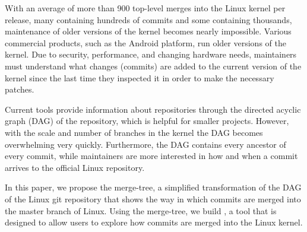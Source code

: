 With an average of more than 900 top-level merges into the Linux kernel
per release, many containing hundreds of commits and some containing
thousands, maintenance of older versions of the kernel becomes nearly
impossible.  Various commercial products, such as the Android platform,
run older versions of the kernel. Due to security, performance, and
changing hardware needs, maintainers must understand what changes
(commits) are added to the current version of the kernel since the last
time they inspected it in order to make the necessary patches.

Current tools provide information about repositories through the
directed acyclic graph (DAG) of the repository, which is helpful for
smaller projects. However, with the scale and number of branches in the
kernel the DAG becomes overwhelming very quickly. Furthermore, the DAG
contains every ancestor of every commit, while maintainers are more
interested in how and when a commit arrives to the official Linux
repository.

In this paper, we propose the merge-tree, a simplified transformation of
the DAG of the Linux git repository that shows the way in which commits
are merged into the master branch of Linux. Using the merge-tree, we
build \tool, a tool that is designed to allow users to explore how
commits are merged into the Linux kernel.
